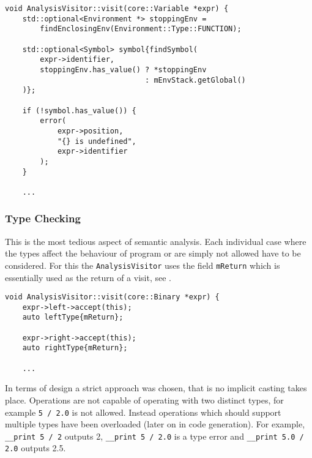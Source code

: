 \begin{lstlisting}[caption={The \texttt{visit(Variable *)}
method in the \texttt{AnalysisVisitor} class
(analysis/AnalysisVisitor.cpp).},label=lst:visitvariable]
void AnalysisVisitor::visit(core::Variable *expr) {
    std::optional<Environment *> stoppingEnv =
        findEnclosingEnv(Environment::Type::FUNCTION);

    std::optional<Symbol> symbol{findSymbol(
        expr->identifier,
        stoppingEnv.has_value() ? *stoppingEnv
                                : mEnvStack.getGlobal()
    )};

    if (!symbol.has_value()) {
        error(
            expr->position,
            "{} is undefined",
            expr->identifier
        );
    }

    ...
\end{lstlisting}

\subsubsection{Type Checking}

This is the most tedious aspect of semantic analysis. Each
individual case where the types affect the behaviour of program
or are simply not allowed have to be considered. For this the
\texttt{AnalysisVisitor} uses the field \texttt{mReturn} which
is essentially used as the return of a visit, see
.

\begin{lstlisting}[caption={A part of the \texttt{visit(Binary
*)} method in the \texttt{AnalysisVisitor} class
(analysis/AnalysisVisitor.cpp).},label=lst:binaryreturn]
void AnalysisVisitor::visit(core::Binary *expr) {
    expr->left->accept(this);
    auto leftType{mReturn};

    expr->right->accept(this);
    auto rightType{mReturn};

    ...
\end{lstlisting}

In terms of design a strict approach was chosen, that is no
implicit casting takes place. Operations are not capable of
operating with two distinct types, for example \texttt{5 / 2.0}
is not allowed. Instead operations which should support multiple
types have been overloaded (later on in code generation). For
example, \texttt{__print 5 / 2} outputs 2, \texttt{__print 5 /
2.0} is a type error and \texttt{__print 5.0 / 2.0} outputs 2.5.

